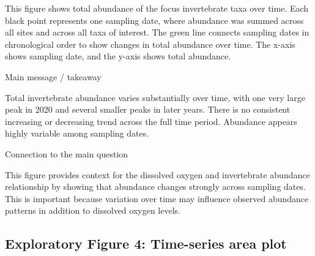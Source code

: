 \documentclass[
  letterpaper,
  DIV=11,
  numbers=noendperiod]{scrartcl}
\begin{document}
This figure shows total abundance of the focus invertebrate taxa over
time. Each black point represents one sampling date, where abundance was
summed across all sites and across all taxa of interest. The green line
connects sampling dates in chronological order to show changes in total
abundance over time. The x-axis shows sampling date, and the y-axis
shows total abundance.

Main message / takeaway

Total invertebrate abundance varies substantially over time, with one
very large peak in 2020 and several smaller peaks in later years. There
is no consistent increasing or decreasing trend across the full time
period. Abundance appears highly variable among sampling dates.

Connection to the main question

This figure provides context for the dissolved oxygen and invertebrate
abundance relationship by showing that abundance changes strongly across
sampling dates. This is important because variation over time may
influence observed abundance patterns in addition to dissolved oxygen
levels.

\subsection{Exploratory Figure 4: Time-series area
plot}\label{exploratory-figure-4-time-series-area-plot}
\end{document}
